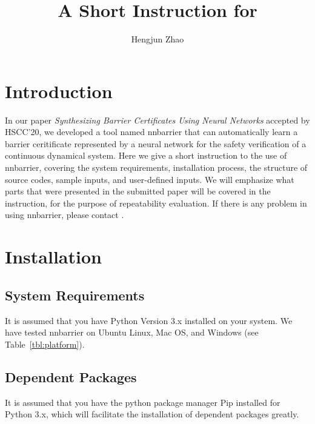 \documentclass{llncs}
\begin{document}
%
\title{A Short Instruction for }
%
%
\author{Hengjun Zhao}

%
\maketitle %
%
%
%
\section{Introduction}
In our paper \emph{Synthesizing Barrier Certificates Using Neural Networks} accepted by HSCC'20, we developed a tool named \textsf{nnbarrier}
that can automatically learn a barrier ceritificate represented by a neural network for the safety verification of a continuous dynamical system. 
Here we give a short instruction to the use of \textsf{nnbarrier}, covering the system requirements, installation process, the structure of source codes,
sample inputs, and user-defined inputs. We will emphasize what parts that were presented in the submitted paper will be covered in the instruction, for the purpose of repeatability
evaluation. If there is any problem in using \textsf{nnbarrier}, please contact .

\section{Installation}

\subsection{System Requirements}
It is assumed that you have \textsf{Python Version 3.x}  installed on your system.
We have tested \textsf{nnbarrier} on Ubuntu Linux, Mac OS, and Windows (see Table~\ref{tbl:platform}).

\subsection{Dependent Packages}
It is assumed that you have the python package manager \textsf{Pip} installed for \textsf{Python 3.x}, which will facilitate
the installation of dependent packages greatly. 
\end{document}
